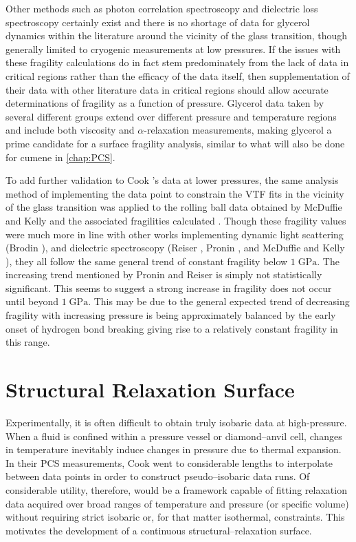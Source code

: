 Other methods such as photon correlation spectroscopy and dielectric loss spectroscopy certainly exist and there is no shortage of data for glycerol dynamics within the literature around the vicinity of the glass transition, though generally limited to cryogenic measurements at low pressures.  If the issues with these fragility calculations do in fact stem predominately from the lack of data in critical regions rather than the efficacy of the data itself, then supplementation of their data with other literature data in critical regions should allow accurate determinations of fragility as a function of pressure. Glycerol data taken by several different groups extend over different pressure and temperature regions and include both viscosity and $\alpha$-relaxation measurements, making glycerol a prime candidate for a surface fragility analysis, similar to what will also be done for cumene in \chap\nolinebreak \ref{chap:PCS}.  

To add further validation to Cook \etal's data at lower pressures, the same analysis method of implementing the \tgp data point to constrain the VTF fits in the vicinity of the glass transition was applied to the rolling ball data obtained by McDuffie and Kelly and the associated fragilities calculated \nolinebreak\cite{McDuffie}.  Though these fragility values were much more in line with other works implementing dynamic light scattering (Brodin \nolinebreak\cite{Brodin}), and dielectric spectroscopy (Reiser \etal \nolinebreak\cite{Reiser}, Pronin \nolinebreak\cite{Pronin}, and McDuffie and Kelly \nolinebreak \nolinebreak\cite{McDuffie}), they all follow the same general trend of constant fragility below $1\;\si{\giga\pascal}$.  The increasing trend mentioned by Pronin and Reiser \etal is simply not statistically significant.  This seems to suggest a strong increase in fragility does not occur until beyond $1\;\si{\giga\pascal}$.  This may be due to the general expected trend of decreasing fragility with increasing pressure is being approximately balanced by the early onset of hydrogen bond breaking giving rise to a relatively constant fragility in this range.

\section{Structural Relaxation Surface}

	Experimentally, it is often difficult to obtain truly isobaric data at high-pressure. When a fluid is confined within a pressure vessel or diamond--anvil cell, changes in temperature inevitably induce changes in pressure due to thermal expansion.  In their PCS measurements, Cook \etal went to considerable lengths to interpolate between data points in order to construct pseudo--isobaric data runs.  Of considerable utility, therefore, would be a framework capable of fitting relaxation data acquired over broad ranges of temperature and pressure (or specific volume) without requiring strict isobaric or, for that matter isothermal, constraints.  This motivates the development of a continuous structural--relaxation surface.

